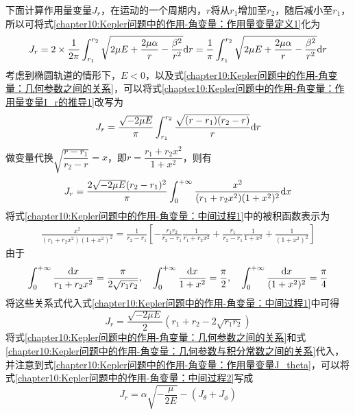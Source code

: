 下面计算作用量变量$J_r$，在运动的一个周期内，$r$将从$r_1$增加至$r_2$，随后减小至$r_1$，所以可将式\eqref{chapter10:Kepler问题中的作用-角变量：作用量变量定义1}化为
\begin{equation}
	J_r = 2\times\frac{1}{2\pi} \int_{r_1}^{r_2} \sqrt{2\mu E+\frac{2\mu\alpha}{r}-\frac{\beta^2}{r^2}} \mathrm{d} r = \frac{1}{\pi} \int_{r_1}^{r_2} \sqrt{2\mu E+\frac{2\mu\alpha}{r}-\frac{\beta^2}{r^2}} \mathrm{d} r
	\label{chapter10:Kepler问题中的作用-角变量：作用量变量I_r的推导1}
\end{equation}
考虑到椭圆轨道的情形下，$E<0$，以及式\eqref{chapter10:Kepler问题中的作用-角变量：几何参数之间的关系}，可以将式\eqref{chapter10:Kepler问题中的作用-角变量：作用量变量I_r的推导1}改写为
\begin{equation}
	J_r = \frac{\sqrt{-2\mu E}}{\pi} \int_{r_1}^{r_2} \frac{\sqrt{(r-r_1)(r_2-r)}}{r}\mathrm{d} r
\end{equation}
做变量代换$\sqrt{\dfrac{r-r_1}{r_2-r}}=x$，即$r=\dfrac{r_1+r_2x^2}{1+x^2}$，则有
\begin{equation}
	J_r = \frac{2\sqrt{-2\mu E}(r_2-r_1)^2}{\pi} \int_0^{+\infty} \frac{x^2}{(r_1+r_2x^2)(1+x^2)^2}\mathrm{d} x
	\label{chapter10:Kepler问题中的作用-角变量：中间过程1}
\end{equation}
将式\eqref{chapter10:Kepler问题中的作用-角变量：中间过程1}中的被积函数表示为
\begin{align*}
	\frac{x^2}{(r_1+r_2x^2)(1+x^2)^2} = \frac{1}{r_2-r_1}\left[-\frac{r_1r_2}{r_2-r_1} \frac{1}{r_1+r_2x^2} + \frac{r_1}{r_2-r_1} \frac{1}{1+x^2} + \frac{1}{(1+x^2)^2}\right]
\end{align*}
由于
\begin{equation*}
	\int_0^{+\infty} \frac{\mathrm{d} x}{r_1+r_2x^2} = \frac{\pi}{2\sqrt{r_1r_2}},\quad \int_0^{+\infty} \frac{\mathrm{d} x}{1+x^2} = \frac\pi2,\quad \int_0^{+\infty} \frac{\mathrm{d} x}{(1+x^2)^2} = \frac\pi4
\end{equation*}
将这些关系式代入式\eqref{chapter10:Kepler问题中的作用-角变量：中间过程1}中可得
\begin{equation}
	J_r = \frac{\sqrt{-2\mu E}}{2}(r_1+r_2-2\sqrt{r_1r_2})
	\label{chapter10:Kepler问题中的作用-角变量：中间过程2}
\end{equation}
将式\eqref{chapter10:Kepler问题中的作用-角变量：几何参数之间的关系}和式\eqref{chapter10:Kepler问题中的作用-角变量：几何参数与积分常数之间的关系}代入，并注意到式\eqref{chapter10:Kepler问题中的作用-角变量：作用量变量J_theta}，可以将式\eqref{chapter10:Kepler问题中的作用-角变量：中间过程2}写成
\begin{equation}
	J_r = \alpha\sqrt{-\frac{\mu}{2E}} - (J_\theta+J_\phi)
	\label{chapter10:Kepler问题中的作用-角变量：作用量变量J_r}
\end{equation}
